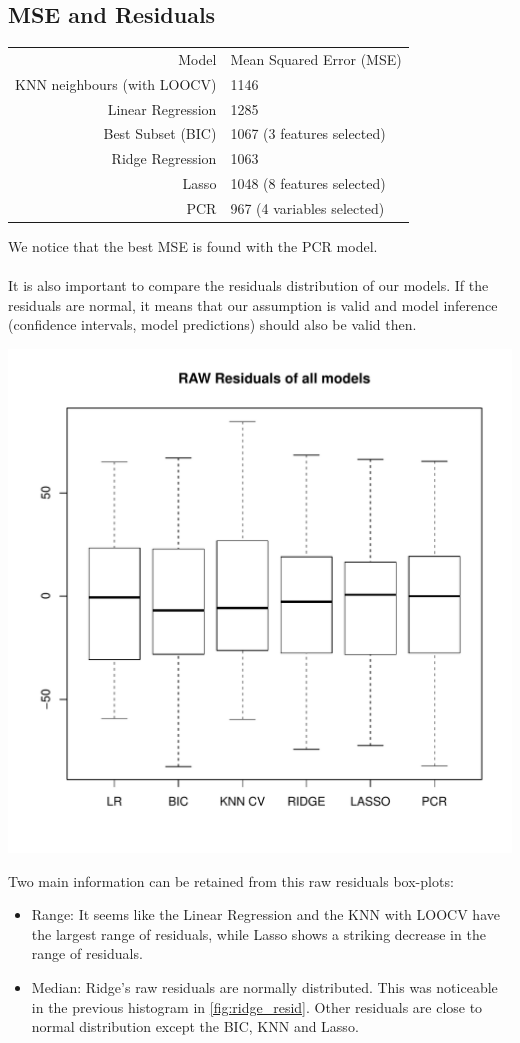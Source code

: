 \documentclass[]{report}
\begin{document}
\subsection{MSE and Residuals}
\begin{center}
\begin{tabular}{r l}
	Model & Mean Squared Error (MSE) \\
	KNN neighbours (with LOOCV) & 1146\\ 
	Linear Regression & 1285\\
	Best Subset (BIC)	& 1067 (3 features selected)\\
	Ridge Regression & 1063 \\	
	Lasso & 1048 (8 features selected)\\
	PCR & 967 (4 variables selected) \\
\end{tabular}
\end{center}

We notice that the best MSE is found with the PCR model.
\\\\
It is also important to compare the residuals distribution of our models. If the residuals are normal, it means that our assumption is valid and model inference (confidence intervals, model predictions) should also be valid then.

\begin{center}
	\includegraphics[width=0.8\linewidth]{Figures/all_resid.pdf}
\end{center}
Two main information can be retained from this raw residuals box-plots: 
\begin{itemize}
\item Range: It seems like the Linear Regression and the KNN with LOOCV have the largest range of residuals, while Lasso shows a striking decrease in the range of residuals.
\item Median: Ridge's raw residuals are normally distributed. This was noticeable in the previous histogram in \ref{fig:ridge_resid}. Other residuals are close to normal distribution except the BIC, KNN and Lasso.
\end{itemize}
\end{document}

